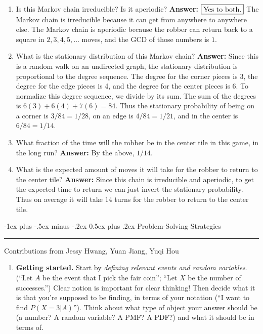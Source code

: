 \documentclass[6pt,landscape]{article}
\makeatletter
\renewcommand{\section}{\@startsection{section}{1}{0mm}%
                                {-1ex plus -.5ex minus -.2ex}%
                                {0.5ex plus .2ex}%
                                {\normalfont\large\bfseries}}
\makeatother
\begin{document}
\begin{multicols*}{3}
\begin{enumerate}[label=(\alph*)]
    \item Is this Markov chain irreducible? Is it aperiodic? \textbf{Answer:} $\boxed{\textnormal{Yes to both.}}$ The Markov chain is irreducible because it can get from anywhere to anywhere else. The Markov chain is  aperiodic because the robber can return back to a square in $2, 3, 4, 5, \dots$ moves, and the GCD of those numbers is $1$.
        \item What is the stationary distribution of this Markov chain? \textbf{Answer:} Since this is a random walk on an undirected graph, the stationary distribution is proportional to the degree sequence. The degree for the corner pieces is 3, the degree for the edge pieces is 4, and the degree for the center pieces is 6. To normalize this degree sequence, we divide by its sum. The sum of the degrees is $6(3) + 6(4) + 7(6) = 84$. Thus the stationary probability of being on a corner is $3/84 = 1/28$, on an edge is $4/84 =  1/21$, and in the center is $6/84 = 1/14$.
    \item What fraction of the time will the robber be in the center tile in this game, in the long run? \textbf{Answer:} By the above, $\boxed{1/14}$.
    \item What is the expected amount of moves it will take for the robber to return to the center tile? \textbf{Answer:} Since this chain is irreducible and aperiodic, to get the expected time to return we can just invert the stationary probability. Thus on average it will take $\boxed{14}$ turns for the robber to return to the center tile.
\end{enumerate}


\section{Problem-Solving Strategies} \smallskip \hrule height 2pt \smallskip

Contributions from Jessy Hwang, Yuan Jiang, Yuqi Hou
\begin{enumerate}
\item \textbf{Getting started.} Start by \emph{defining relevant events and random variables}. (``Let $A$ be the event that I pick the fair coin''; ``Let $X$ be the number of successes.'') Clear notion is important for clear thinking! Then decide what it is that you're supposed to be finding, in terms of your notation (``I want to find $P(X=3|A)$''). Think about what type of object your answer should be (a number? A random variable? A PMF? A PDF?) and what it should be in terms of.


\end{enumerate}
\end{multicols*}
\end{document}

